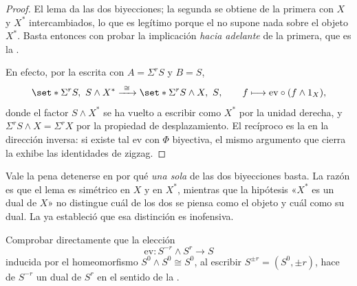 \begin{proof}
El lema da las dos biyecciones; la segunda se obtiene de la primera con $X$ y $X^*$ intercambiados, lo que es legítimo porque el  no supone nada sobre el objeto $X^*$. Basta entonces con probar la implicación \emph{hacia adelante} de la primera, que es la .

En efecto, por la  escrita con $A=\Sigma^rS$ y $B=S$,
\[
\set*{\Sigma^rS,\ S\wedge X^*}\xrightarrow{\ \cong\ }\set*{\Sigma^rS\wedge X,\ S},
\qquad
f\longmapsto\mathrm{ev}\circ(f\wedge1_X),
\]
donde el factor $S\wedge X^*$ se ha vuelto a escribir como $X^*$ por la unidad derecha, y $\Sigma^rS\wedge X=\Sigma^rX$ por la propiedad de desplazamiento. El recíproco es la  en la dirección inversa: si existe tal $\mathrm{ev}$ con $\Phi$ biyectiva, el mismo argumento que cierra la  exhibe las identidades de zigzag.
\end{proof}

\begin{nota}
   Vale la pena detenerse en por qué \emph{una sola} de las dos biyecciones basta. La razón es que el lema es simétrico en $X$ y en $X^*$, mientras que la hipótesis «$X^*$ es un dual de $X$» no distingue cuál de los dos se piensa como el objeto y cuál como su dual. La  ya estableció que esa distinción es inofensiva.
\end{nota}

\begin{ejer}
Comprobar directamente que la elección
\[
\mathrm{ev}\colon S^{-r}\wedge S^r\longrightarrow S
\]
inducida por el homeomorfismo $S^0\wedge S^0\cong S^0$, al escribir $S^{\pm r}=(S^0,\pm r)$, hace de $S^{-r}$ un dual de $S^r$ en el sentido de la .
\end{ejer}

